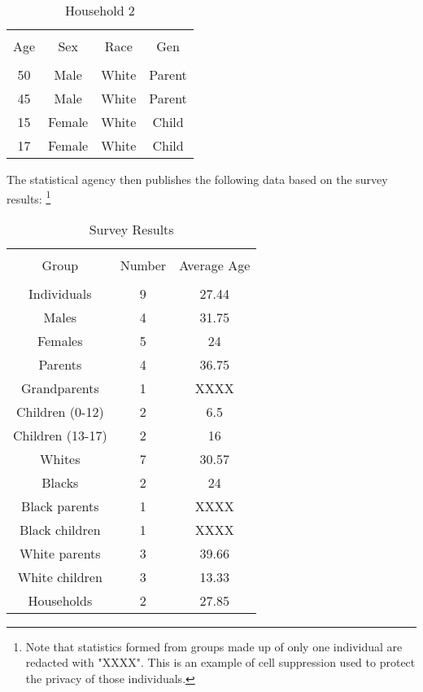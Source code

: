 \documentclass[jou,apacite]{apa6}
\begin{document}
\begin{table}[!htb]
\caption{Household 2}\label{tab2}
\begin{tabular}{cccc}
\hline\\[-1.5ex]
Age & Sex & Race & Gen \\[0.5ex]
\hline\\[-1.5ex]
50 & Male & White & Parent\\[0.5ex]
45 & Male & White & Parent\\[0.5ex]
15 & Female & White & Child\\[0.5ex]
17 & Female & White & Child\\[0.5ex]
\hline
\end{tabular}
\end{table}

The statistical agency then publishes the following data based
on the survey results: \footnote {Note that statistics formed from groups made up of only one individual are redacted with "XXXX". This is an example of cell suppression used to protect the privacy of those individuals.}

\begin{table}[!htb]
\caption{Survey Results}\label{tab3}
\begin{tabular}{ccc}
\hline\\[-1.5ex]
Group & Number & Average Age \\[0.5ex]
\hline\\[-1.5ex]
Individuals & 9 & 27.44 \\[0.5ex]
Males & 4 & 31.75 \\[0.5ex]
Females & 5 & 24 \\[0.5ex]
Parents & 4 & 36.75 \\[0.5ex]
Grandparents & 1 & XXXX \\[0.5ex]
Children (0-12) & 2 & 6.5 \\[0.5ex]
Children (13-17) & 2 & 16 \\[0.5ex]
Whites & 7 & 30.57 \\[0.5ex]
Blacks & 2 & 24 \\[0.5ex]
Black parents & 1 & XXXX \\[0.5ex]
Black children & 1 & XXXX\\[0.5ex]
White parents & 3 & 39.66 \\[0.5ex]
White children & 3 & 13.33 \\[0.5ex]
Households & 2 & 27.85 \\[0.5ex]
\hline
\end{tabular}
\end{table}
\end{document}
